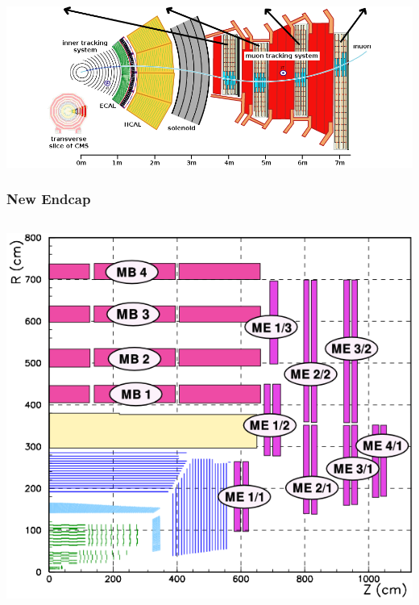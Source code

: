 \documentclass[compress]{beamer}
\begin{document}
\begin{frame}
\includegraphics[width=\linewidth]{cms_slice.png}
\end{frame}

\begin{frame}
\frametitle{New Endcap }

\begin{columns}
\includegraphics[width=\linewidth]{muon_system.png}

\end{columns}
\end{frame}
\end{document}
